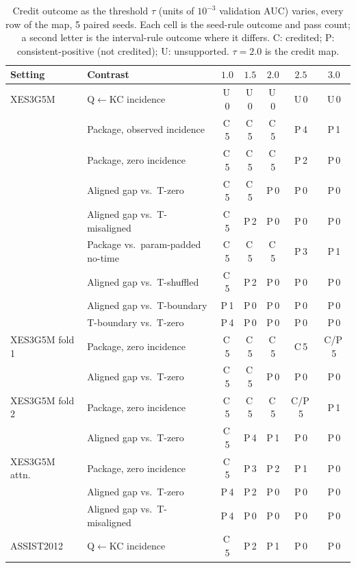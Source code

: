 \begin{table}[H]
\caption{Credit outcome as the threshold $\tau$ (units of $10^{-3}$
validation AUC) varies, every row of the map, 5 paired seeds. Each
cell is the seed-rule outcome and pass count; a second letter is the
interval-rule outcome where it differs. C: credited; P:
consistent-positive (not credited); U: unsupported. $\tau=2.0$ is the
credit map.}
\label{tab:threshold-all}
\centering
\scriptsize
\setlength{\tabcolsep}{1.5pt}
\renewcommand{\arraystretch}{0.84}
\begin{tabular}{@{}llccccc@{}}
\toprule
Setting & Contrast & $1.0$ & $1.5$ & $2.0$ & $2.5$ & $3.0$ \\
\midrule
XES3G5M & Q$\leftarrow$KC incidence & U\,0 & U\,0 & U\,0 & U\,0 & U\,0 \\
 & Package, observed incidence & C\,5 & C\,5 & C\,5 & P\,4 & P\,1 \\
 & Package, zero incidence & C\,5 & C\,5 & C\,5 & P\,2 & P\,0 \\
 & Aligned gap vs.\ T-zero & C\,5 & C\,5 & P\,0 & P\,0 & P\,0 \\
 & Aligned gap vs.\ T-misaligned & C\,5 & P\,2 & P\,0 & P\,0 & P\,0 \\
 & Package vs.\ param-padded no-time & C\,5 & C\,5 & C\,5 & P\,3 & P\,1 \\
 & Aligned gap vs.\ T-shuffled & C\,5 & P\,2 & P\,0 & P\,0 & P\,0 \\
 & Aligned gap vs.\ T-boundary & P\,1 & P\,0 & P\,0 & P\,0 & P\,0 \\
 & T-boundary vs.\ T-zero & P\,4 & P\,0 & P\,0 & P\,0 & P\,0 \\
\addlinespace
XES3G5M fold 1 & Package, zero incidence & C\,5 & C\,5 & C\,5 & C\,5 & C/P\,5 \\
 & Aligned gap vs.\ T-zero & C\,5 & C\,5 & P\,0 & P\,0 & P\,0 \\
\addlinespace
XES3G5M fold 2 & Package, zero incidence & C\,5 & C\,5 & C\,5 & C/P\,5 & P\,1 \\
 & Aligned gap vs.\ T-zero & C\,5 & P\,4 & P\,1 & P\,0 & P\,0 \\
\addlinespace
XES3G5M attn. & Package, zero incidence & C\,5 & P\,3 & P\,2 & P\,1 & P\,0 \\
 & Aligned gap vs.\ T-zero & P\,4 & P\,2 & P\,0 & P\,0 & P\,0 \\
 & Aligned gap vs.\ T-misaligned & P\,4 & P\,0 & P\,0 & P\,0 & P\,0 \\
\addlinespace
ASSIST2012 & Q$\leftarrow$KC incidence & C\,5 & P\,2 & P\,1 & P\,0 & P\,0 \\

\end{tabular}
\end{table}
